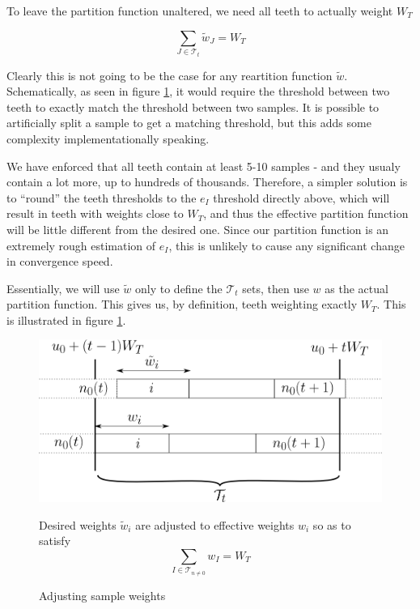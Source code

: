 \documentclass[./thesis.tex]{subfiles}
\begin{document}
To leave the partition function unaltered, we need all teeth to actually weight $W_T$

\begin{equation}
\sum_{J \in \mathcal{T}_t} \tilde w_J = W_T
\end{equation}

Clearly this is not going to be the case for any reartition function $\tilde w$. Schematically, as seen in figure \ref{fig:toothbuilding}, it would require the threshold between two teeth to exactly match the threshold between two samples. It is possible to artificially split a sample to get a matching threshold, but this adds some complexity implementationally speaking.

We have enforced that all teeth contain at least 5-10 samples - and they usualy contain a lot more, up to hundreds of thousands. Therefore, a simpler solution is to ``round'' the teeth thresholds to the $e_I$ threshold directly above, which will result in teeth with weights close to $W_T$, and thus the effective partition function will be little different from the desired one. Since our partition function is an extremely rough estimation of $e_I$, this is unlikely to cause any significant change in convergence speed.

Essentially, we will use $\tilde w$ only to define the $\mathcal{T}_t$ sets, then use $w$ as the actual partition function. This gives us, by definition, teeth weighting exactly $W_T$.
This is illustrated in figure \ref{fig:toothbuilding}.
 
 \begin{figure}[h!]
	\begin{center}
		\includegraphics[width=0.9\columnwidth]{figures/pt2/toothbuilding}
		\caption{Adjusting sample weights}
		\label{fig:toothbuilding}
		 Desired weights $\tilde w_i$ are adjusted to effective weights $w_i$ so as to satisfy
		 $$\sum_{I \in \mathcal{T}_{n \neq 0}} w_I = W_T$$
	\end{center}
\end{figure}
\end{document}
